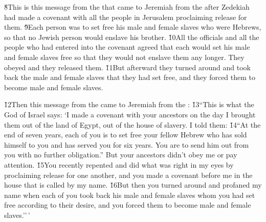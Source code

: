\v{8}This is this message from the  that came to Jeremiah from the  after Zedekiah had made a covenant with all the people in Jerusalem proclaiming release for them. \v{9}Each person was to set free his male and female slaves who were Hebrews, so that no Jewish person would enslave his brother. \v{10}All the officials and all the people who had entered into the covenant agreed that each would set his male and female slaves free so that they would not enslave them any longer. They obeyed and they released them. \v{11}But afterward they turned around and took back the male and female slaves that they had set free, and they forced them to become male and female slaves.

\v{12}Then this message from the  came to Jeremiah from the : \v{13}``This is what the  God of Israel says: `I made a covenant with your ancestors on the day I brought them out of the land of Egypt, out of the house of slavery. I told them: \v{14}``At the end of seven years, each of you is to set free your fellow Hebrew who has sold himself to you and has served you for six years. You are to send him out from you with no further obligation.'' But your ancestors didn't obey me or pay attention. \v{15}You recently repented and did what was right in my eyes by proclaiming release for one another, and you made a covenant before me in the house that is called by my name. \v{16}But then you turned around and profaned my name when each of you took back his male and female slaves whom you had set free according to their desire, and you forced them to become male and female slaves.''\,'

